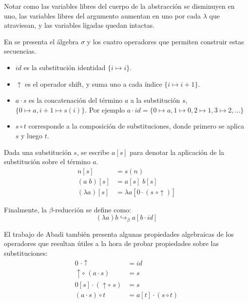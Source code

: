 Notar como las variables libres del cuerpo de la abstracción se disminuyen en uno, las variables libres del argumento aumentan en uno por cada $\lambda$ que atraviesan, y las variables ligadas quedan intactas.


En \cite{explicit_subs} se presenta el álgebra $\sigma$ y los cuatro operadores que permiten construir estas secuencias.

\begin{itemize}
	\item $id$ es la substitución identidad $\{i \mapsto i\}$.
	\item $\uparrow$ es el operador shift, y suma uno a cada índice $\{i \mapsto i+1\}$.
	\item $a \cdot s$ es la concatenación del término $a$ a la substitución $s$, $\{0 \mapsto a, i+1 \mapsto s(i)\}$. Por ejemplo $a \cdot id = \{ 0 \mapsto a, 1 \mapsto 0, 2 \mapsto 1, 3 \mapsto 2, \dots \} $
	\item $s \circ t$ corresponde a la composición de substituciones, donde primero se aplica $s$ y luego $t$.
\end{itemize}

Dada una substitución $s$, se escribe $a[s]$ para denotar la aplicación de la substitución sobre el término $a$.
\begin{align*}
	n[s] &= s(n) \\
	(a\; b)[s] &= a[s]\; b[s] \\
	(\lambda a)[s] &= \lambda a[0 \cdot (s \; \circ \uparrow)]
\end{align*}

Finalmente, la $\beta$-reducción se define como:
\[ (\lambda a)b \hookrightarrow_{\beta} a[b \cdot id] \]

El trabajo de Abadi también presenta algunas propiedades algebraicas de los operadores que resultan útiles a la hora de probar propiedades sobre las substituciones:
\begin{align*}
	0 \; \cdot \uparrow &= id \\
	\uparrow \circ\; (a \cdot s) &= s \\
	0[s] \cdot (\uparrow \circ\; s) &= s \\
	(a \cdot s) \circ t &= a[t] \cdot (s \circ t) \\
\end{align*}
 
